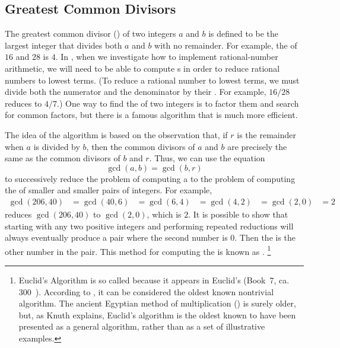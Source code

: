 \subsection{Greatest Common Divisors}
\label{Section 1.2.5}

The greatest common divisor () of two integers \( a \) and \( b \) is defined to be the largest integer that divides both \( a \) and \( b \) with no remainder.
For example, the  of \( 16 \) and \( 28 \) is \( 4 \).
In , when we investigate how to implement rational-number arithmetic, we will need to be able to compute s in order to reduce rational numbers to lowest terms.
(To reduce a rational number to lowest terms, we must divide both the numerator and the denominator by their .
For example, \( 16/28 \) reduces to \( 4/7 \).)
One way to find the  of two integers is to factor them and search for common factors, but there is a famous algorithm that is much more efficient.

The idea of the algorithm is based on the observation that, if \( r \) is the remainder when \( a \) is divided by \( b \), then the common divisors of \( a \) and \( b \) are precisely the same as the common divisors of \( b \) and \( r \).
Thus, we can use the equation
\[
	\gcd(a, b) = \gcd(b, r)
\]
to successively reduce the problem of computing a  to the problem of computing the  of smaller and smaller pairs of integers.
For example,
\begin{align*}
	\gcd(206,40)
	&= \gcd(40,6)
	&= \gcd(6,4)
	&= \gcd(4,2)
	&= \gcd(2,0)
	&= 2
\end{align*}
reduces \( \gcd(206, 40) \) to \( \gcd(2, 0) \), which is \( 2 \).
It is possible to show that starting with any two positive integers and performing repeated reductions will always eventually produce a pair where the second number is \( 0 \).
Then the  is the other number in the pair.
This method for computing the  is known as .%
\footnote{
	Euclid’s Algorithm is so called because it appears in Euclid’s  (Book 7, ca. 300 ).
	According to , it can be considered the oldest known nontrivial algorithm.
	The ancient Egyptian method of multiplication () is surely older, but, as Knuth explains, Euclid’s algorithm is the oldest known to have been presented as a general algorithm, rather than as a set of illustrative examples.
}

